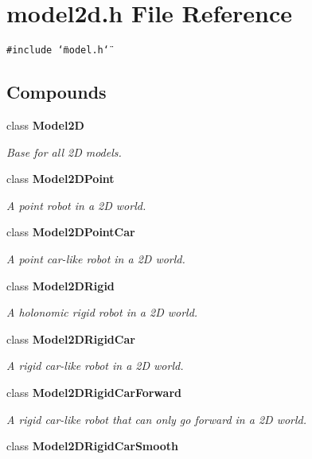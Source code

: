\section{model2d.h File Reference}
\label{model2d_h}
{\tt \#include \char`\"{}model.h\char`\"{}}\par
\subsection*{Compounds}
\begin{CompactItemize}
\item 
class {\bf Model2D}
\begin{CompactList}\small\item\em Base for all 2D models.\item\end{CompactList}\item 
class {\bf Model2DPoint}
\begin{CompactList}\small\item\em A point robot in a 2D world.\item\end{CompactList}\item 
class {\bf Model2DPoint\-Car}
\begin{CompactList}\small\item\em A point car-like robot in a 2D world.\item\end{CompactList}\item 
class {\bf Model2DRigid}
\begin{CompactList}\small\item\em A holonomic rigid robot in a 2D world.\item\end{CompactList}\item 
class {\bf Model2DRigid\-Car}
\begin{CompactList}\small\item\em A rigid car-like robot in a 2D world.\item\end{CompactList}\item 
class {\bf Model2DRigid\-Car\-Forward}
\begin{CompactList}\small\item\em A rigid car-like robot that can only go forward in a 2D world.\item\end{CompactList}\item 
class {\bf Model2DRigid\-Car\-Smooth}

\end{CompactItemize}
